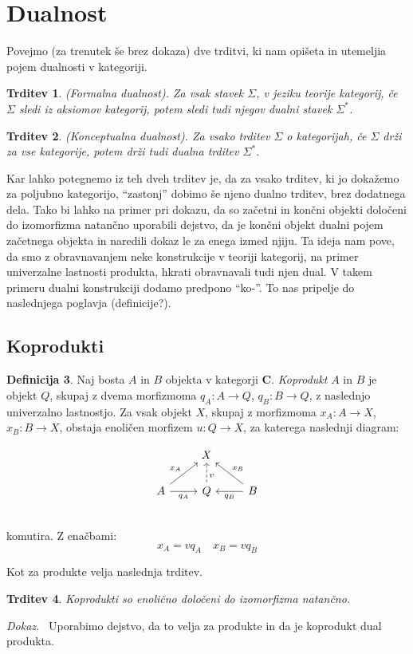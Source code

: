 \documentclass[12pt,a4paper]{book}
\theoremstyle{definition}
\newtheorem{definicija}{Definicija}[chapter]
\theoremstyle{plain}
\newtheorem{trditev}[definicija]{Trditev}
\newenvironment{dokaz}{\emph{Dokaz.}\ }{\hspace{\fill}{$\Box$}}
\theoremstyle{definition}
\theoremstyle{remark}
\newcommand{\cat}[1]{\textbf{#1}}
\begin{document}
\section{Dualnost}
Povejmo (za trenutek še brez dokaza) dve trditvi, ki nam opišeta in utemeljia pojem dualnosti v kategoriji.

\begin{trditev} \textit{(Formalna dualnost)}. 
Za vsak stavek $\Sigma$, v jeziku teorije kategorij, če $\Sigma$ sledi iz aksiomov kategorij, potem sledi tudi njegov dualni stavek $\Sigma^*$.
\end{trditev}

\begin{trditev} \textit{(Konceptualna dualnost)}.
Za vsako trditev $\Sigma$ o kategorijah, če $\Sigma$ drži za vse kategorije, potem drži tudi dualna trditev $\Sigma^*$.
\end{trditev}

Kar lahko potegnemo iz teh dveh trditev je, da za vsako trditev, ki jo dokažemo za poljubno kategorijo, "`zastonj"' dobimo še njeno dualno trditev, brez dodatnega dela. Tako bi lahko na primer pri dokazu, da so začetni in končni objekti določeni do izomorfizma natančno uporabili dejstvo, da je končni objekt dualni pojem začetnega objekta in naredili dokaz le za enega izmed njiju.
Ta ideja nam pove, da smo z obravnavanjem neke konstrukcije v teoriji kategorij, na primer univerzalne lastnosti produkta, hkrati obravnavali tudi njen dual. V takem primeru dualni konstrukciji dodamo predpono "`ko-"'. To nas pripelje do naslednjega poglavja (definicije?).

\subsection{Koprodukti}
\begin{definicija}
Naj bosta $A$ in $B$ objekta v kategorji $\cat{C}$. \textit{Koprodukt} $A$ in $B$ je objekt $Q$, skupaj z dvema morfizmoma $q_A : A \to Q$, $q_B : B \to Q$, z naslednjo univerzalno lastnostjo. Za vsak objekt $X$, skupaj z morfizmoma $x_A : A \to X$, $x_B : B \to X$, obstaja enoličen morfizem $u : Q \to X$, za katerega naslednji diagram:

$$\begin{tikzcd}
& X & \\
A \ar[ur, "x_A"] \ar[r, "q_A"'] & Q \ar[u, dashed, pos=0.35, "v"']  & B \ar[l, "q_B"] \ar[ul, "x_B"'] \\
\end{tikzcd}$$
komutira. Z enačbami:
$$x_A = v q_A \quad x_B = v q_B$$
\end{definicija}
Kot za produkte velja naslednja trditev.
\begin{trditev}
Koprodukti so enolično določeni do izomorfizma natančno.
\end{trditev}
\begin{dokaz}
Uporabimo dejstvo, da to velja za produkte in da je koprodukt dual produkta.
\end{dokaz}
\end{document}
